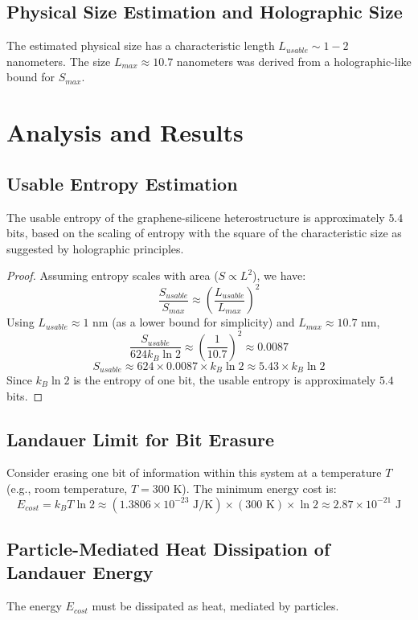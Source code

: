 		\subsection{Physical Size Estimation and Holographic Size}
		The estimated physical size has a characteristic length $L_{usable} \sim 1-2$ nanometers. The size $L_{max} \approx 10.7$ nanometers was derived from a holographic-like bound for $S_{max}$.
		
		\section{Analysis and Results}
		
		\subsection{Usable Entropy Estimation}
		\begin{proposition}
			The usable entropy of the graphene-silicene heterostructure is approximately $5.4$ bits, based on the scaling of entropy with the square of the characteristic size as suggested by holographic principles.
		\end{proposition}
		\begin{proof}
			Assuming entropy scales with area ($S \propto L^2$), we have:
			$$ \frac{S_{usable}}{S_{max}} \approx \left( \frac{L_{usable}}{L_{max}} \right)^2 $$
			Using $L_{usable} \approx 1$ nm (as a lower bound for simplicity) and $L_{max} \approx 10.7$ nm,
			$$ \frac{S_{usable}}{624 k_B \ln 2} \approx \left( \frac{1}{10.7} \right)^2 \approx 0.0087 $$
			$$ S_{usable} \approx 624 \times 0.0087 \times k_B \ln 2 \approx 5.43 \times k_B \ln 2 $$
			Since $k_B \ln 2$ is the entropy of one bit, the usable entropy is approximately $5.4$ bits.
		\end{proof}
		
		\subsection{Landauer Limit for Bit Erasure}
		Consider erasing one bit of information within this system at a temperature $T$ (e.g., room temperature, $T = 300$ K). The minimum energy cost is:
		$$ E_{cost} = k_B T \ln 2 \approx (1.3806 \times 10^{-23} \text{ J/K}) \times (300 \text{ K}) \times \ln 2 \approx 2.87 \times 10^{-21} \text{ J} $$
		
		\subsection{Particle-Mediated Heat Dissipation of Landauer Energy}
		The energy $E_{cost}$ must be dissipated as heat, mediated by particles.
		
